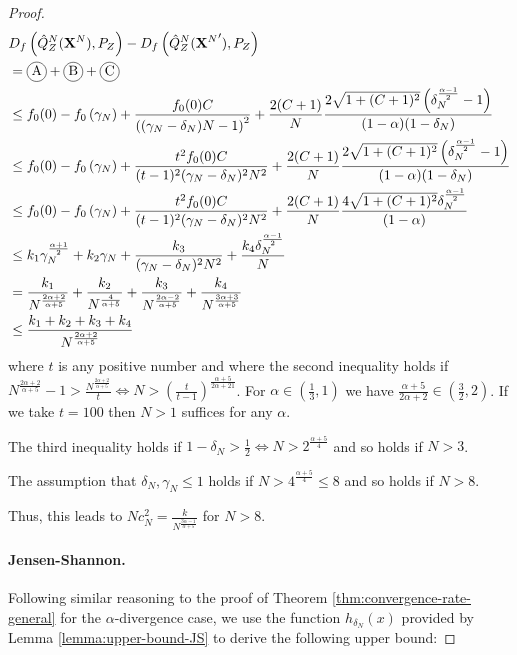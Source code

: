 \begin{proof}
\begin{align*}
    &D_f\left( \hat{Q}_Z^N(\XN) , P_Z\right) - D_f\left( \hat{Q}_Z^N({\XN}') , P_Z\right) \\
    &= \encircle{A} + \encircle{B} + \encircle{C} \\
    &\leq f_0(0) - f_0\left(\gamma_N\right) + \frac{f_0(0)C}{\left((\gamma_N-\delta_N)N - 1\right)^2} + \frac{2(C+1)}{N}\frac{2\sqrt{1+(C+1)^2}\left(\delta_N^\frac{\alpha-1}{2} - 1\right)}{(1-\alpha) (1-\delta_N)} \\
    &\leq f_0(0) - f_0\left(\gamma_N\right) + \frac{t^2f_0(0)C}{(t-1)^2(\gamma_N-\delta_N)^2N^2} + \frac{2(C+1)}{N}\frac{2\sqrt{1+(C+1)^2}\left(\delta_N^\frac{\alpha-1}{2} - 1\right)}{(1-\alpha) (1-\delta_N)} \\
    &\leq f_0(0) - f_0\left(\gamma_N\right) + \frac{t^2f_0(0)C}{(t-1)^2(\gamma_N-\delta_N)^2N^2} + \frac{2(C+1)}{N}\frac{4\sqrt{1+(C+1)^2}\delta_N^\frac{\alpha-1}{2}}{(1-\alpha)} \\
    &\leq k_1 \gamma_N^{\frac{\alpha+1}{2}} + k_2 \gamma_N +\frac{k_3}{(\gamma_N-\delta_N)^2N^2} + \frac{k_4 \delta_N^\frac{\alpha-1}{2}}{N} \\
    &= \frac{k_1}{N^{\frac{2\alpha+2}{\alpha+5}}} + \frac{k_2}{N^\frac{4}{\alpha+5}} + \frac{k_3}{N^{\frac{2\alpha -2}{\alpha+5}}} +\frac{k_4}{N^{\frac{3\alpha+3}{\alpha+5}}} \\
    &\leq \frac{k_1+k_2+k_3 + k_4}{N^{\frac{2\alpha+2}{\alpha+5}}}
\end{align*}
where $t$ is any positive number and where the second inequality holds if $N^\frac{2\alpha+2}{\alpha+5} - 1 > \frac{N^\frac{2\alpha+2}{\alpha+5}}{t} \iff N > (\frac{t}{t-1})^{\frac{\alpha+5}{2\alpha+21}}$.
For $\alpha \in (\frac{1}{3}, 1)$ we have $\frac{\alpha+5}{2\alpha+2} \in (\frac{3}{2}, 2)$. 
If we take $t=100$ then $N> 1$ suffices for any $\alpha$.

The third inequality holds if $1-\delta_N > \frac{1}{2} \iff N>2^\frac{\alpha+5}{4}$ and so holds if $N>3$.

The assumption that $\delta_N, \gamma_N \leq 1$ holds if $N>4^\frac{\alpha+5}{4}\leq8$ and so holds if $N>8$.

Thus, this leads to $Nc_N^2 = \frac{k}{N^{\frac{3\alpha - 1}{\alpha+5}}}$ for $N>8$.


\paragraph{Jensen-Shannon.}

Following similar reasoning to the proof of Theorem \ref{thm:convergence-rate-general} for the $\alpha$-divergence case, we use the function $h_{\delta_N}(x)$ provided by Lemma \ref{lemma:upper-bound-JS} to derive the following upper bound:



\end{proof}
